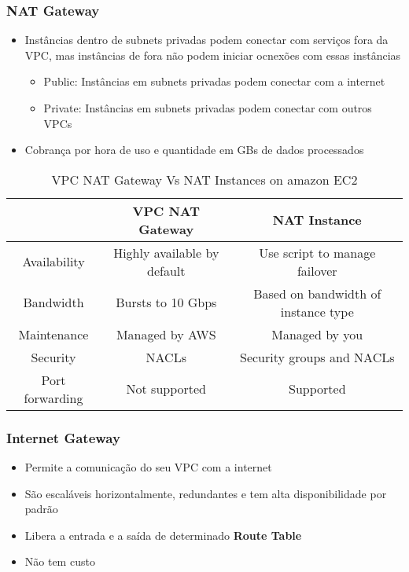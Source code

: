 \begin{frame}[allowframebreaks]
	\frametitle{NAT Gateway}
	\begin{itemize}
		\item Instâncias dentro de subnets privadas podem conectar com serviços fora da VPC, mas instâncias de fora não podem iniciar ocnexões com essas instâncias
			\begin{itemize}
				\item Public: Instâncias em subnets privadas podem conectar com a internet
				\item Private: Instâncias em subnets privadas podem conectar com outros VPCs
			\end{itemize}
		\item Cobrança por hora de uso e quantidade em GBs de dados processados
	\end{itemize}
	\framebreak
	\begin{table}[htpb]
		\centering
		\caption{VPC NAT Gateway Vs NAT Instances on amazon EC2}
		\begin{tabular}{|c|c|c|}
			\hline
			& VPC NAT Gateway & NAT Instance \\
			\hline \hline
			Availability & Highly available by default & Use script to manage failover \\
			\hline
			Bandwidth & Bursts to 10 Gbps & Based on bandwidth of instance type \\
			\hline
			Maintenance & Managed by AWS & Managed by you \\
			\hline
			Security & NACLs & Security groups and NACLs \\
			\hline
			Port forwarding & Not supported & Supported \\
			\hline
		\end{tabular}
	\end{table}
\end{frame}
\begin{frame}
	\frametitle{Internet Gateway}
	\begin{itemize}
		\item Permite a comunicação do seu VPC com a internet
		\item São escaláveis horizontalmente, redundantes e tem alta disponibilidade por padrão
		\item Libera a entrada e a saída de determinado \textbf{Route Table}
		\item Não tem custo
	\end{itemize}
\end{frame}

